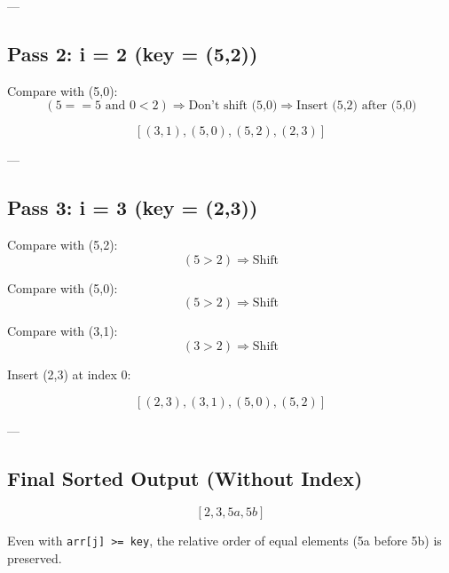 \documentclass[14pt]{extarticle}
\begin{document}
---

\subsection*{Pass 2: i = 2 (key = (5,2))}

Compare with (5,0):  
\[
(5 == 5 \text{ and } 0 < 2) \Rightarrow \text{Don't shift (5,0)}  
\Rightarrow \text{Insert (5,2) after (5,0)}
\]

\[
[(3,1), (5,0), (5,2), (2,3)]
\]

---

\subsection*{Pass 3: i = 3 (key = (2,3))}

Compare with (5,2):  
\[
(5 > 2) \Rightarrow \text{Shift}
\]

Compare with (5,0):  
\[
(5 > 2) \Rightarrow \text{Shift}
\]

Compare with (3,1):  
\[
(3 > 2) \Rightarrow \text{Shift}
\]

Insert (2,3) at index 0:

\[
[(2,3), (3,1), (5,0), (5,2)]
\]

---

\subsection*{Final Sorted Output (Without Index)}

\[
[2, 3, 5a, 5b]
\]

\begin{tcolorbox}[colback=white, colframe=black, title=Stability Verified]
Even with \texttt{arr[j] >= key}, the relative order of equal elements (5a before 5b) is preserved.
\end{tcolorbox}
\end{document}
